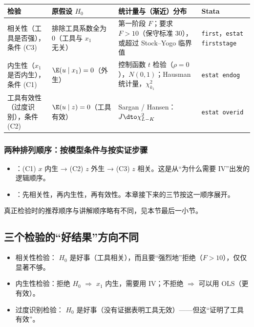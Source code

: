 \begin{center}
\small
\begin{tabularx}{\linewidth}{>{\raggedright\arraybackslash}p{2.3cm}>{\raggedright\arraybackslash}p{3.3cm}L>{\raggedright\arraybackslash}p{2.6cm}}
\toprule
检验 & 原假设 $H_0$ & 统计量与（渐近）分布 & Stata\\
\midrule
相关性（工具是否强），条件 (C3) & 排除工具系数全为 0（工具与 $x_1$ 无关） & 第一阶段 $F$；要求 $F>10$（保守标准 30），或超过 Stock--Yogo 临界值 & \texttt{first}，\texttt{estat firststage}\\
内生性（$x_1$ 是否内生），条件 (C1) & $\E(u\mid x_1)=0$（外生） & 控制函数 $t$ 检验（$\rho=0$），$N(0,1)$；Hausman 统计量，$\chi^2_{k_1}$ & \texttt{estat endog}\\
工具有效性（过度识别），条件 (C2) & $\E(u\mid z)=0$（工具有效） & Sargan / Hansen：$J\dto\chi^2_{L-K}$ & \texttt{estat overid}\\
\bottomrule
\end{tabularx}
\end{center}

\subsubsection{两种排列顺序：按模型条件与按实证步骤}

\begin{itemize}
  \item {}：(C1) $x$ 内生 → (C2) $z$ 外生 → (C3) $z$ 相关。这是从“为什么需要 IV”出发的逻辑顺序。
  \item {}：先相关性，再内生性，再有效性。本章接下来的三节按这一顺序展开。
\end{itemize}
真正检验时的推荐顺序与讲解顺序略有不同，见本节最后一小节。

\subsection{三个检验的“好结果”方向不同}

\begin{note}
\begin{itemize}
  \item 相关性检验： $H_0$ 是好事（工具相关），而且要“强烈地”拒绝（$F>10$），仅仅显著不够。
  \item 内生性检验：拒绝 $H_0$ $\Rightarrow$ $x_1$ 内生，需要用 IV；不拒绝 $\Rightarrow$ 可以用 OLS（更有效）。
  \item 过度识别检验： $H_0$ 是好事（没有证据表明工具无效）——但这“证明了工具有效”。
\end{itemize}
\end{note}

